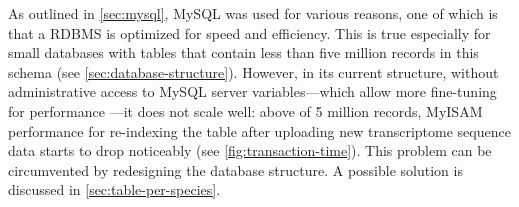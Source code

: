 \label{sec:mysql-performance}
As outlined in \autoref{sec:mysql}, MySQL was used for various reasons, one of
which is that a RDBMS is optimized for speed and efficiency. This is true
especially for small databases with tables that contain less than five million
records in this schema (see \autoref{sec:database-structure}). However, in its
current structure, without administrative access to MySQL server
variables---which allow more fine-tuning for performance
\citep{schwartz2012}---it does not scale well: above of 5 million records,
MyISAM performance for re-indexing the table after uploading new transcriptome
sequence data starts to drop noticeably (see \autoref{fig:transaction-time}). 
This problem can be circumvented by redesigning the database structure. A
possible solution is discussed in \autoref{sec:table-per-species}.



